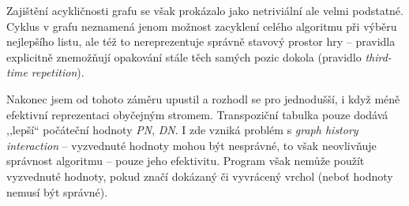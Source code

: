 \documentclass{article}
\begin{document}
Zajištění acykličnosti grafu se však prokázalo jako netriviální ale velmi podstatné. Cyklus v grafu neznamená jenom
možnost zacyklení celého algoritmu při výběru nejlepšího listu, ale též to nereprezentuje správně stavový prostor hry --
pravidla explicitně znemožňují opakování stále těch samých pozic dokola (pravidlo \emph{third-time repetition}).

Nakonec jsem od tohoto záměru upustil a rozhodl se pro jednodušší, i když méně efektivní reprezentaci obyčejným
stromem. Transpoziční tabulka pouze dodává ,,lepší`` počáteční hodnoty \emph{PN}, \emph{DN}. I zde vzniká problém s
\emph{graph history interaction} -- vyzvednuté hodnoty mohou být nesprávné, to však neovlivňuje správnost algoritmu --
pouze jeho efektivitu. Program však nemůže použít vyzvednuté hodnoty, pokud značí dokázaný či vyvrácený vrchol (neboť
hodnoty nemusí být správné).
\end{document}

